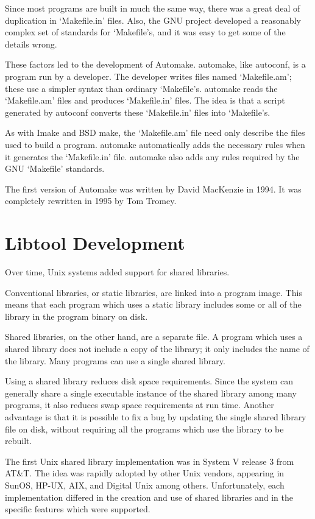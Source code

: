 Since most programs are built in much the same way, there was a great deal of duplication in `Makefile.in' files. Also, the GNU project developed a reasonably complex set of standards for `Makefile's, and it was easy to get some of the details wrong. 


These factors led to the development of Automake. automake, like autoconf, is a program run by a developer. The developer writes files named `Makefile.am'; these use a simpler syntax than ordinary `Makefile's. automake reads the `Makefile.am' files and produces `Makefile.in' files. The idea is that a script generated by autoconf converts these `Makefile.in' files into `Makefile's. 


As with Imake and BSD make, the `Makefile.am' file need only describe the files used to build a program. automake automatically adds the necessary rules when it generates the `Makefile.in' file. automake also adds any rules required by the GNU `Makefile' standards. 


The first version of Automake was written by David MacKenzie in 1994. It was completely rewritten in 1995 by Tom Tromey.

\section{Libtool Development}


Over time, Unix systems added support for shared libraries. 


Conventional libraries, or static libraries, are linked into a program image. This means that each program which uses a static library includes some or all of the library in the program binary on disk. 


Shared libraries, on the other hand, are a separate file. A program which uses a shared library does not include a copy of the library; it only includes the name of the library. Many programs can use a single shared library. 


Using a shared library reduces disk space requirements. Since the system can generally share a single executable instance of the shared library among many programs, it also reduces swap space requirements at run time. Another advantage is that it is possible to fix a bug by updating the single shared library file on disk, without requiring all the programs which use the library to be rebuilt. 


The first Unix shared library implementation was in System V release 3 from AT\&T. The idea was rapidly adopted by other Unix vendors, appearing in SunOS, HP-UX, AIX, and Digital Unix among others. Unfortunately, each implementation differed in the creation and use of shared libraries and in the specific features which were supported. 


